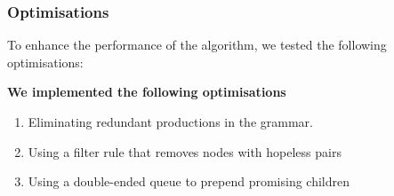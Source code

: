 \documentclass[10pt]{beamer}
\begin{document}
  



\begin{frame}
  \frametitle{Optimisations}
  To enhance the performance of the algorithm, we tested the following optimisations:
  
  \textbf{We implemented the following optimisations}
  \begin{enumerate}
  \item Eliminating redundant productions in the grammar.
  \item Using a filter rule that removes nodes with hopeless pairs
  \item Using a double-ended queue to prepend promising children
  \end{enumerate}
\end{frame}
\end{document}

